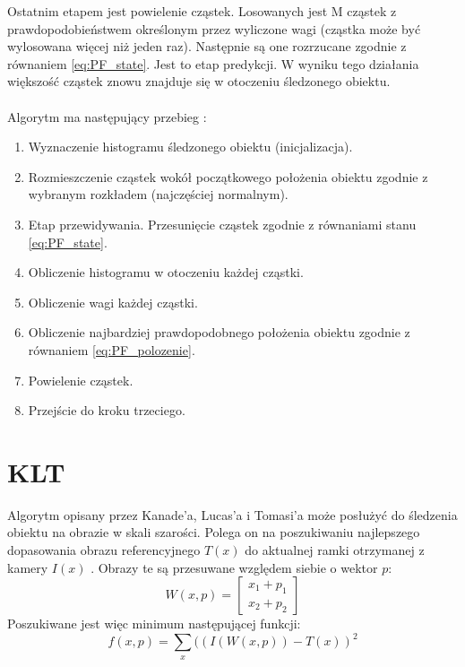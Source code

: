 Ostatnim etapem jest powielenie cząstek. 
Losowanych jest M cząstek z prawdopodobieństwem określonym przez wyliczone wagi (cząstka może być wylosowana więcej niż jeden raz). 
Następnie są one rozrzucane zgodnie z równaniem \ref{eq:PF_state}. 
Jest to etap predykcji. 
W wyniku tego działania większość cząstek znowu znajduje się w otoczeniu śledzonego obiektu.

\paragraph*{}
Algorytm ma następujący przebieg \cite{Meresinski}:
\begin{enumerate}
\item Wyznaczenie histogramu śledzonego obiektu (inicjalizacja).
\item Rozmieszczenie cząstek wokół początkowego położenia obiektu zgodnie z wybranym rozkładem (najczęściej normalnym).
\item Etap przewidywania. Przesunięcie cząstek zgodnie z równaniami stanu \ref{eq:PF_state}.
\item Obliczenie histogramu w otoczeniu każdej cząstki.
\item Obliczenie wagi każdej cząstki.
\item Obliczenie najbardziej prawdopodobnego położenia obiektu zgodnie z równaniem \ref{eq:PF_polozenie}.
\item Powielenie cząstek.
\item Przejście do kroku trzeciego.
\end{enumerate}

\section{KLT}
\label{sec:klt}

Algorytm opisany przez Kanade'a, Lucas'a i Tomasi'a może posłużyć do śledzenia obiektu na obrazie w skali szarości.
Polega on na poszukiwaniu najlepszego dopasowania obrazu referencyjnego \(T(x)\) do aktualnej ramki otrzymanej z kamery \(I(x)\) \cite{TSK}. 
Obrazy te są przesuwane względem siebie o wektor \(p\):
\begin{equation}
W(x,p)=
	\begin{bmatrix}
	x_1+p_1 \\
	x_2+p_2
	\end{bmatrix}
\end{equation}
Poszukiwane jest więc minimum następującej funkcji:
\begin{equation}
f(x,p)=\sum\limits_{x}((I(W(x,p))-T(x))^2
\end{equation}

